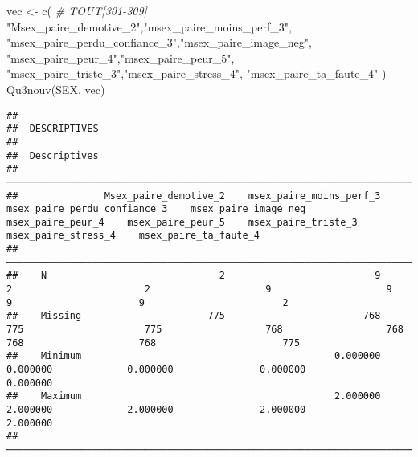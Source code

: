 \documentclass[
]{article}
\newenvironment{Shaded}{\begin{snugshade}}{\end{snugshade}}
\newcommand{\CommentTok}[1]{\textcolor[rgb]{0.56,0.35,0.01}{\textit{#1}}}
\newcommand{\FunctionTok}[1]{\textcolor[rgb]{0.00,0.00,0.00}{#1}}
\newcommand{\NormalTok}[1]{#1}
\newcommand{\OtherTok}[1]{\textcolor[rgb]{0.56,0.35,0.01}{#1}}
\newcommand{\StringTok}[1]{\textcolor[rgb]{0.31,0.60,0.02}{#1}}
\begin{document}
\begin{Shaded}
\begin{Highlighting}[]
\NormalTok{vec }\OtherTok{\textless{}{-}} \FunctionTok{c}\NormalTok{(  }\CommentTok{\# TOUT[301{-}309]}
  \StringTok{"Msex\_paire\_demotive\_2"}\NormalTok{,}\StringTok{"msex\_paire\_moins\_perf\_3"}\NormalTok{,                         }
  \StringTok{"msex\_paire\_perdu\_confiance\_3"}\NormalTok{,}\StringTok{"msex\_paire\_image\_neg"}\NormalTok{,                                }
  \StringTok{"msex\_paire\_peur\_4"}\NormalTok{,}\StringTok{"msex\_paire\_peur\_5"}\NormalTok{,                              }
  \StringTok{"msex\_paire\_triste\_3"}\NormalTok{,}\StringTok{"msex\_paire\_stress\_4"}\NormalTok{,                                 }
  \StringTok{"msex\_paire\_ta\_faute\_4"}              
\NormalTok{  )}
\FunctionTok{Qu3nouv}\NormalTok{(SEX, vec)}
\end{Highlighting}
\end{Shaded}

\begin{verbatim}
## 
##  DESCRIPTIVES
## 
##  Descriptives                                                                                                                                                                                                                             
##  ──────────────────────────────────────────────────────────────────────────────────────────────────────────────────────────────────────────────────────────────────────────────────────────────────────────────────────────────────────── 
##               Msex_paire_demotive_2    msex_paire_moins_perf_3    msex_paire_perdu_confiance_3    msex_paire_image_neg    msex_paire_peur_4    msex_paire_peur_5    msex_paire_triste_3    msex_paire_stress_4    msex_paire_ta_faute_4   
##  ──────────────────────────────────────────────────────────────────────────────────────────────────────────────────────────────────────────────────────────────────────────────────────────────────────────────────────────────────────── 
##    N                              2                          9                               2                       2                    9                    9                      9                      9                        2   
##    Missing                      775                        768                             775                     775                  768                  768                    768                    768                      775   
##    Minimum                                            0.000000                                                                     0.000000             0.000000               0.000000               0.000000                            
##    Maximum                                            2.000000                                                                     2.000000             2.000000               2.000000               2.000000                            
##  ────────────────────────────────────────────────────────────────────────────────────────────────────────────────────────────────────────────────────────────────────────────────────────────────────────────────────────────────────────
\end{verbatim}
\end{document}

